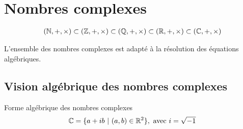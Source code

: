 \chapter{Nombres complexes}
\begin{align*}
(\mathbb{N}, +, \times) \subset (\mathbb{Z}, +, \times) \subset (\mathbb{Q}, +, \times) \subset (\mathbb{R}, +, \times) \subset (\mathbb{C}, +, \times)
\end{align*}
\par L'ensemble des nombres complexes est adapté à la résolution des équations algébriques.

\section{Vision algébrique des nombres complexes}

\begin{definition}{Forme algébrique des nombres complexes}
\begin{align*}
\mathbb{C} = \{a + ib \ | \ (a, b) \in \mathbb{R}^2 \}, \text{ avec } i = \sqrt{-1}
\end{align*}
\end{definition}


